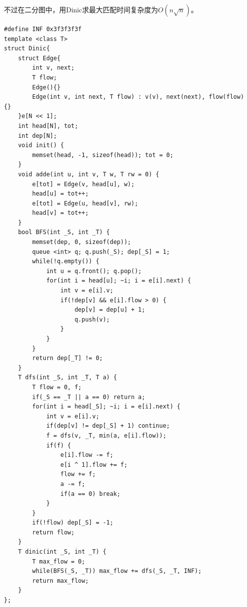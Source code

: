 \documentclass[a4paper,11pt,twoside,fontset = fandol,UTF8]{ctexbook} %
\begin{document}
不过在二分图中，用Dinic求最大匹配时间复杂度为$O(n\sqrt{n})$。
    \begin{lstlisting}
#define INF 0x3f3f3f3f
template <class T>
struct Dinic{
    struct Edge{
        int v, next;
        T flow;
        Edge(){}
        Edge(int v, int next, T flow) : v(v), next(next), flow(flow) {}
    }e[N << 1];
    int head[N], tot;
    int dep[N];
    void init() {
        memset(head, -1, sizeof(head)); tot = 0;
    }
    void adde(int u, int v, T w, T rw = 0) {
        e[tot] = Edge(v, head[u], w);
        head[u] = tot++;
        e[tot] = Edge(u, head[v], rw);
        head[v] = tot++;
    }
    bool BFS(int _S, int _T) {
        memset(dep, 0, sizeof(dep));
        queue <int> q; q.push(_S); dep[_S] = 1;
        while(!q.empty()) {
            int u = q.front(); q.pop();
            for(int i = head[u]; ~i; i = e[i].next) {
                int v = e[i].v;
                if(!dep[v] && e[i].flow > 0) {
                    dep[v] = dep[u] + 1;
                    q.push(v);
                }
            }
        }
        return dep[_T] != 0;
    }
    T dfs(int _S, int _T, T a) {
        T flow = 0, f;
        if(_S == _T || a == 0) return a;
        for(int i = head[_S]; ~i; i = e[i].next) {
            int v = e[i].v;
            if(dep[v] != dep[_S] + 1) continue;
            f = dfs(v, _T, min(a, e[i].flow));
            if(f) {
                e[i].flow -= f;
                e[i ^ 1].flow += f;
                flow += f;
                a -= f;
                if(a == 0) break;
            }
        }
        if(!flow) dep[_S] = -1;
        return flow;
    }
    T dinic(int _S, int _T) {
        T max_flow = 0;
        while(BFS(_S, _T)) max_flow += dfs(_S, _T, INF);
        return max_flow;
    }
};
	\end{lstlisting}
\end{document}
